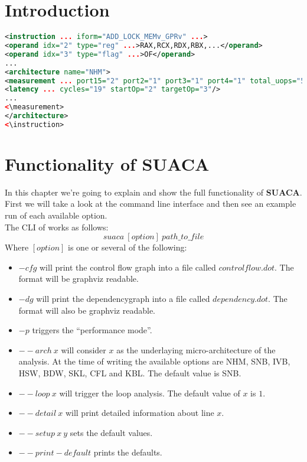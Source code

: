 \documentclass[a4paper,12pt,titlepage, twoside]{report}
\newcommand{\suaca}{\textbf{SUACA}}
\begin{document}
\newpage
\thispagestyle{empty}
\mbox{}

\setcounter{page}{0}
\tableofcontents 



\chapter{Introduction}
\begin{lstlisting}[language=XML, basicstyle=\ttfamily\scriptsize, breaklines=true]
<instruction ... iform="ADD_LOCK_MEMv_GPRv" ...>
<operand idx="2" type="reg" ...>RAX,RCX,RDX,RBX,...</operand>
<operand idx="3" type="flag" ...>OF</operand>
...
<architecture name="NHM">
<measurement ... port15="2" port2="1" port3="1" port4="1" total_uops="5">
<latency ... cycles="19" startOp="2" targetOp="3"/>
...
<\measurement>
</architecture>
<\instruction>
\end{lstlisting}
\label{lst:xml}









\chapter{Functionality of SUACA}
In this chapter we're going to explain and show the full functionality of \suaca. First we will take a look at the command line interface and then see an example run of each available option.\\
The CLI of works as follows:\\
\[
suaca\ [option]\ path\_to\_file
\]
Where $[option]$ is one or several of the following:
\begin{itemize}
    \item $-cfg$ will print the control flow graph into a file called $controlflow.dot$. The format will be graphviz readable.
    \item $-dg$ will print the dependencygraph into a file called $dependency.dot$. The format will also be graphviz readable.
    \item $-p$ triggers the ``performance mode''.
    \item ${--}arch\ x$ will consider $x$ as the underlaying micro-architecture of the analysis. At the time of writing the available options are NHM, SNB, IVB, HSW, BDW, SKL, CFL and KBL. The default value is SNB.
    \item ${--}loop\ x$ will trigger the loop analysis. The default value of $x$ is $1$.
    \item ${--}detail\ x$ will print detailed information about line $x$.
    \item ${--}setup\ x\ y$ sets the default values.
    \item ${--}print-default$ prints the defaults.
\end{itemize}
\end{document}
